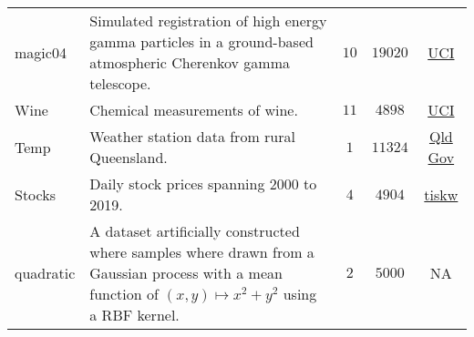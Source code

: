 \begin{longtable}{lp{}ccc}
    magic04                                                                  & Simulated registration of high energy
    gamma particles in a ground-based atmospheric Cherenkov gamma telescope. & $10$                                                                                                                                                                                 & $19020$ & \href{https://archive.ics.uci.edu/ml/datasets/magic+gamma+telescope}{UCI}                                                                                                                                 \\
    Wine                                                                     & Chemical measurements of wine.                                                                                                                                                       & $11$    & $4898$                                                                    & \href{https://archive.ics.uci.edu/ml/datasets/Wine+Quality}{UCI}                                                              \\
    Temp                                                                     & Weather station data from rural Queensland.                                                                                                                                          & $1$     & $11324$                                                                   & \href{https://www.longpaddock.qld.gov.au/}{Qld Gov}                                                                           \\
    Stocks                                                                   & Daily stock prices spanning 2000 to 2019.                                                                                                                                            & $4$     & $4904$                                                                    & \href{https://github.com/tiskw/random-fourier-features/blob/main/dataset/stockprice/download_stockprice_zipped_csv.py}{tiskw}
    \\
    quadratic                                                                & A dataset artificially constructed where samples where drawn from a Gaussian process with a mean function of $(x,y) \mapsto x^2 + y^2$ using a RBF kernel.                           & $2$     & $5000$                                                                    & NA
    \\\bottomrule
    \hline
\end{longtable}

